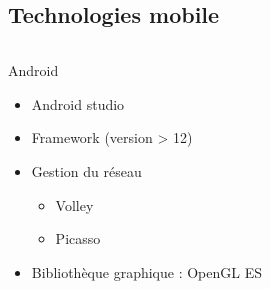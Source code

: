 \documentclass{beamer} %
\begin{document}
  \subsection{Technologies mobile}
  \begin{frame}{\subsecname}
  \begin{columns}
    \begin{column}{0.58\textwidth}
      \begin{block}{Android}
        \begin{itemize}
          \item Android studio
          \item Framework (version > 12)
          \item Gestion du réseau
          \begin{itemize}
            \item Volley
            \item Picasso
          \end{itemize}
          \item Bibliothèque graphique : OpenGL ES
        \end{itemize}
      \end{block}
      

\end{column}
\end{columns}
\end{frame}
\end{document}

